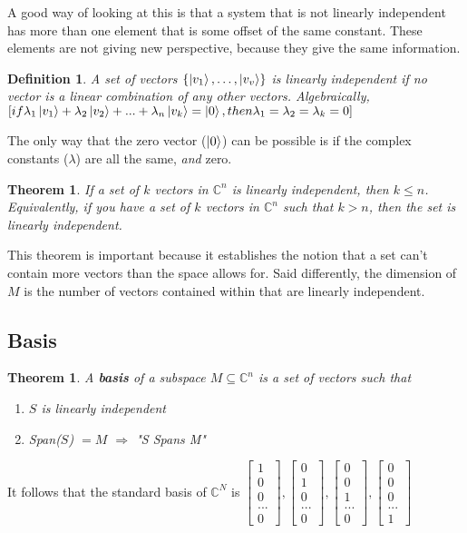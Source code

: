 \documentclass[12pt]{article}
\theoremstyle{plain}
\newtheorem{theorem}[lemma]{Theorem}
\theoremstyle{nonumberplain}
\theoremstyle{plain}
\newtheorem{definition}[lemma]{Definition}
\theoremstyle{nonumberplain}
\newcommand\1{{\bf 1}}
\newcommand{\bmat}[1]{\begin{bmatrix*} #1 \end{bmatrix*}} %
\newcommand{\setovecs}[1]{\lb \ket{v_1}, \ldots, \ket{v_{#1}}\rb} %
\newcommand{\C}{\mathbb{C}} %
\newcommand{\<}{\left\langle}
\renewcommand{\>}{\right\rangle}
\newcommand{\lb}{\left\{}
\newcommand{\rb}{\right\}}
\begin{document}
A good way of looking at this is that a system that is not linearly independent has more than one element that is some offset of the same constant. These elements are not giving new perspective, because they give the same information.

\begin{definition}\label{•}
A set of vectors $\setovecs{v}$ is linearly independent if no vector is a linear combination of any other vectors. Algebraically, $[if \lambda_1\ket{v_1} + \lambda_2\ket{v_2} + ... + \lambda_n\ket{v_k}=\ket{0}, then \lambda_1=\lambda_2=\lambda_k=0]$
\end{definition}

The only way that the zero vector ($\ket{0}$) can be possible is if the complex constants ($\lambda$) are all the same, \textit{and} zero.

\begin{theorem}
If a set of $k$ vectors in $\C^n$ is linearly independent, then $k \leq n$. Equivalently, if you have a set of $k$ vectors in $\C^n$ such that $k>n$, then the set is linearly independent.
\end{theorem}

This theorem is important because it establishes the notion that a set can't contain more vectors than the space allows for. Said differently, the dimension of $M$ is the number of vectors contained within that are linearly independent.


\subsection{Basis}
\begin{theorem}
A \textbf{basis} of a subspace $M\subseteq\C^n$ is a set of vectors such that
\begin{enumerate}
	\item $S$ is linearly independent
	\item Span($S$) $=M$ $\Longrightarrow$ "S Spans M"
\end{enumerate}
\end{theorem}
It follows that the standard basis of $\C^N$ is $\bmat{1 \\ 0 \\ 0 \\ ... \\ 0},\bmat{0 \\ 1 \\ 0 \\ ... \\ 0},\bmat{0 \\ 0 \\ 1 \\ ... \\ 0},\bmat{0 \\ 0 \\ 0 \\ ... \\ 1}$
\end{document}
